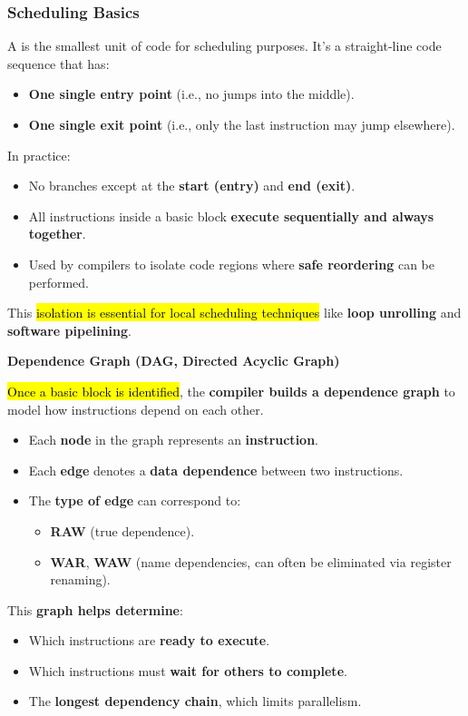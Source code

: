 \subsubsection{Scheduling Basics}

A  is the smallest unit of code for scheduling purposes. It's a straight-line code sequence that has:
\begin{itemize}
    \item \textbf{One single entry point} (i.e., no jumps into the middle).
    \item \textbf{One single exit point} (i.e., only the last instruction may jump elsewhere).
\end{itemize}
In practice:
\begin{itemize}
    \item No branches except at the \textbf{start (entry)} and \textbf{end (exit)}.
    \item All instructions inside a basic block \textbf{execute sequentially and always together}.
    \item Used by compilers to isolate code regions where \textbf{safe reordering} can be performed.
\end{itemize}
This \hl{isolation is essential for local scheduling techniques} like \textbf{loop unrolling} and \textbf{software pipelining}.

\highspace
\begin{flushleft}
    \textcolor{Green3}{ \textbf{Dependence Graph (DAG, Directed Acyclic Graph)}}
\end{flushleft}
\hl{Once a basic block is identified}, the \textbf{compiler builds a dependence graph} to model how instructions depend on each other.
\begin{itemize}
    \item Each \textbf{node} in the graph represents an \textbf{instruction}.
    \item Each \textbf{edge} denotes a \textbf{data dependence} between two instructions.
    \item The \textbf{type of edge} can correspond to:
    \begin{itemize}
        \item \textbf{RAW} (true dependence).
        \item \textbf{WAR}, \textbf{WAW} (name dependencies, can often be eliminated via register renaming).
    \end{itemize}
\end{itemize}
This \textbf{graph helps determine}:
\begin{itemize}[label=\textcolor{Green3}{}]
    \item Which instructions are \textbf{ready to execute}.
    \item Which instructions must \textbf{wait for others to complete}.
    \item The \textbf{longest dependency chain}, which limits parallelism.
\end{itemize}

